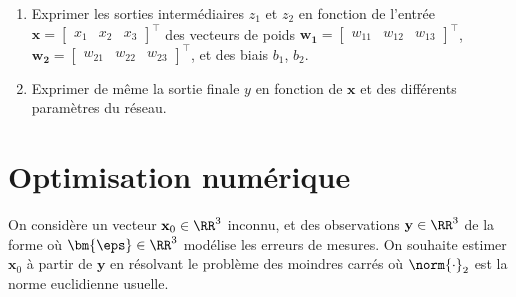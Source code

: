 \documentclass[11pt]{article}
\begin{document}
\begin{enumerate}
	\begin{enumerate}
	\item Exprimer les sorties intermédiaires $z_1$ et $z_2$ en fonction de l'entrée $\mathbf{x} = \begin{bmatrix} x_1 & x_2 & x_3\end{bmatrix}^\top$ des vecteurs de poids $\mathbf{w_1} = \begin{bmatrix} w_{11} & w_{12} & w_{13} \end{bmatrix}^\top$, $\mathbf{w_2} = \begin{bmatrix} w_{21} & w_{22} & w_{23} \end{bmatrix}^\top$, et des biais $b_1$, $b_2$.
	\item  Exprimer de même la sortie finale $y$ en fonction de $\mathbf{x}$ et des différents paramètres du réseau.
	\end{enumerate}
\end{enumerate}


\section{Optimisation numérique}


\label{sec:mc}
On considère un vecteur $\mathbf{x}_0 \in \RR^3$ inconnu, et des observations $\mathbf{y}\in\RR^3$ de la forme
où $\bm{\eps} \in \RR^3$ modélise les erreurs de mesures. On souhaite estimer $\mathbf{x}_0$ à partir de $\mathbf{y}$ en résolvant le problème des moindres carrés
où $\norm{\cdot}_2$ est la norme euclidienne usuelle.
\end{document}
